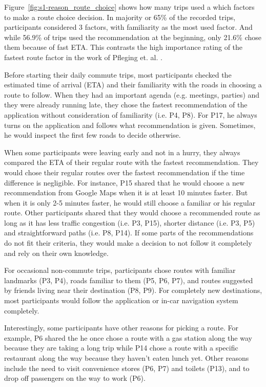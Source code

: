 Figure~\ref{fig:s1-reason_route_choice} shows how many trips used a which factors to make a route choice decision. In majority or 65\% of the recorded trips, participants considered 3 factors, with familiarity as the most used factor. And while 56.9\% of trips used the recommendation at the beginning, only 21.6\% chose them because of fast ETA. This contrasts the high importance rating of the fastest route factor in the work of Pfleging et. al. \cite{Pfleging2014ExperienceNavigation}.

Before starting their daily commute trips, most participants checked the estimated time of arrival (ETA) and their familiarity with the roads in choosing a route to follow. When they had an important agenda (e.g. meetings, parties) and they were already running late, they chose the fastest recommendation of the application without consideration of familiarity (i.e. P4, P8). For P17, he always turns on the application and follows what recommendation is given. Sometimes, he would inspect the first few roads to decide otherwise.  

When some participants were leaving early and not in a hurry, they always compared the ETA of their regular route with the fastest recommendation. They would chose their regular routes over the fastest recommendation if the time difference is negligible. For instance, P15 shared that he would choose a new recommendation from Google Maps when it is at least 10 minutes faster. But when it is only 2-5 minutes faster, he would still choose a familiar or his regular route. Other participants shared that they would choose a recommended route as long as it has less traffic congestion (i.e. P3, P15), shorter distance (i.e. P3, P5) and straightforward paths (i.e. P8, P14). If some parts of the recommendations do not fit their criteria, they would make a decision to not follow it completely and rely on their own knowledge. 

For occasional non-commute trips, participants chose routes with familiar landmarks (P3, P4), roads familiar to them (P5, P6, P7), and routes suggested by friends living near their destination (P8, P9). For completely new destinations, most participants would follow the application or in-car navigation system completely.

Interestingly, some participants have other reasons for picking a route. For example, P6 shared the he once chose a route with a gas station along the way because they are taking a long trip while P14 chose a route with a specific restaurant along the way because they haven't eaten lunch yet. Other reasons include the need to visit convenience stores (P6, P7) and toilets (P13), and to drop off passengers on the way to work (P6).

